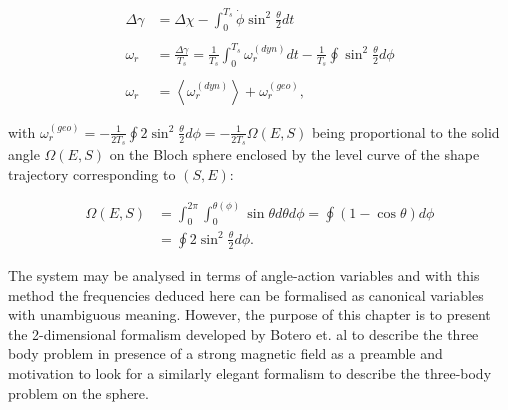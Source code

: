 \begin{align*}
\Delta \gamma &= \Delta \chi - \int_0^{T_s}\dot{\phi}\sin^2{\frac{\theta}{2}}dt\\
\\
\omega_r &= \frac{\Delta \gamma}{T_s} = \frac{1}{T_s}\int_0^{T_s}\omega_r^{(dyn)}dt -\frac{1}{T_s}\oint\sin^2{\frac{\theta}{2}}d\phi\\
\\
\omega_r &= \left\langle \omega_r^{(dyn)} \right\rangle + \omega_r^{(geo)},
\end{align*}

with $\omega_r^{(geo)}= -\frac{1}{2T_s}\oint 2\sin^2{\frac{\theta}{2}}d\phi = -\frac{1}{2T_s}\Omega(E,S)$ being proportional to the solid angle $\Omega(E,S)$ on the Bloch sphere enclosed by the level curve of the shape trajectory corresponding to $(S,E)$:

\begin{align*}
\Omega(E,S) &= \int_0^{2\pi}\int_0^{\theta(\phi)} \sin{\theta}d\theta d\phi = \oint (1-\cos{\theta})d\phi\\ 
&= \oint 2\sin^2{\frac{\theta}{2}}d\phi.
\end{align*}

The system may be analysed in terms of angle-action variables and with this method the frequencies deduced here can be formalised as canonical variables with unambiguous meaning. However, the purpose of this chapter is to present the 2-dimensional formalism developed by Botero et. al to describe the three body problem in presence of a strong magnetic field as a preamble and motivation to look for a similarly elegant formalism to describe the three-body problem on the sphere.





